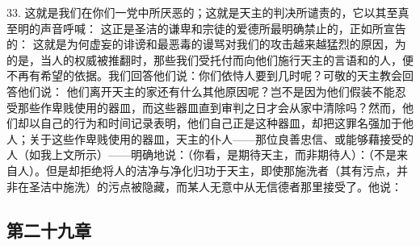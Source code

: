 33. 这就是我们在你们一党中所厌恶的；这就是天主的判决所谴责的，它以其至真至明的声音呼喊： 这正是圣洁的谦卑和宗徒的爱德所最明确禁止的，正如所宣告的： 这就是为何虚妄的诽谤和最恶毒的谩骂对我们的攻击越来越猛烈的原因，为的是，当人的权威被推翻时，那些我们受托付而向他们施行天主的言语和的人，便不再有希望的依据。我们回答他们说：你们依恃人要到几时呢？可敬的天主教会回答他们说： 他们离开天主的家还有什么其他原因呢？岂不是因为他们假装不能忍受那些作卑贱使用的器皿，而这些器皿直到审判之日才会从家中清除吗？然而，他们却以自己的行为和时间记录表明，他们自己正是这种器皿，却把这罪名强加于他人；关于这些作卑贱使用的器皿，天主的仆人——那位良善忠信、或能够藉接受的人（如我上文所示）——明确地说：（你看，是期待天主，而非期待人）：（不是来自人）。但是却拒绝将人的洁净与净化归功于天主，即使那施洗者（其有污点，并非在圣洁中施洗）的污点被隐藏，而某人无意中从无信德者那里接受了。他说：\par


\subsection{第二十九章}


